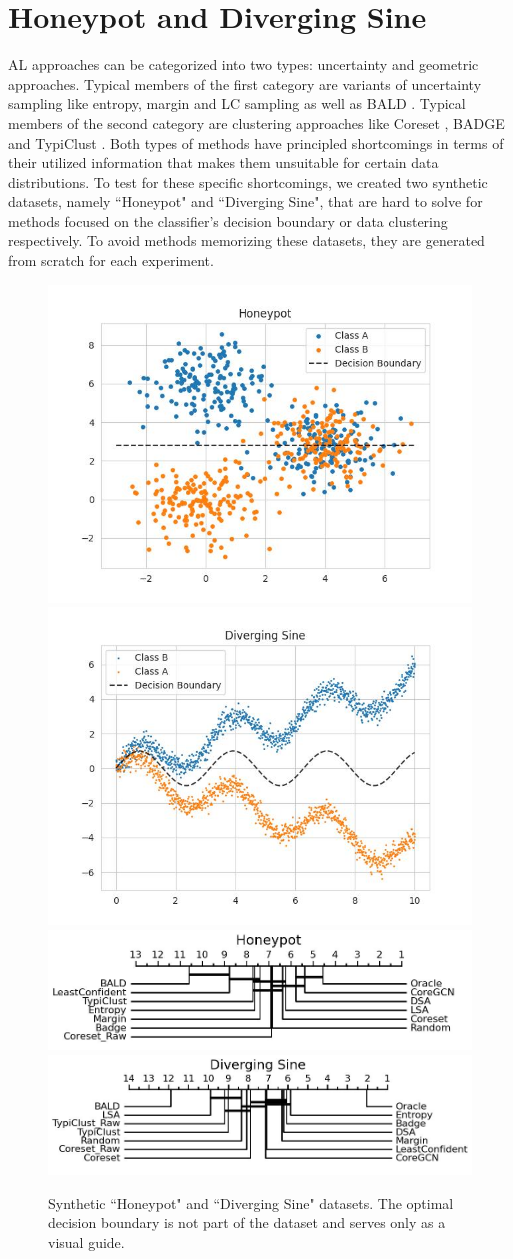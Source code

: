 \documentclass[]{article}
\begin{document}
\section{Honeypot and Diverging Sine}
AL approaches can be categorized into two types: uncertainty and geometric approaches.
Typical members of the first category are variants of uncertainty sampling like entropy, margin and LC sampling \cite{wang2014new} as well as BALD \cite{gal2017deep}.
Typical members of the second category are clustering approaches like Coreset \cite{sener2017active}, BADGE \cite{ashdeep} and TypiClust \cite{hacohen2022active}.
Both types of methods have principled shortcomings in terms of their utilized information that makes them unsuitable for certain data distributions. 
To test for these specific shortcomings, we created two synthetic datasets, namely ``Honeypot" and ``Diverging Sine", that are hard to solve for methods focused on the classifier's decision boundary or data clustering respectively. 
To avoid methods memorizing these datasets, they are generated from scratch for each experiment. \\
\begin{figure}[]
	\centering
	\caption{Synthetic ``Honeypot" and ``Diverging Sine" datasets. The optimal decision boundary is not part of the dataset and serves only as a visual guide.}
	\label{fig:synth_results}
	\includegraphics[width=0.4\linewidth]{img/honeypot.jpg}
	\hspace{10mm}
	\includegraphics[width=0.4\linewidth]{img/diverging_sin.jpg}
	\includegraphics[width=0.49\linewidth]{img/micro_honeypot.jpg}
	\includegraphics[width=0.49\linewidth]{img/micro_diverging_sin.jpg}
	\vspace{-5mm}
\end{figure}
\end{document}
